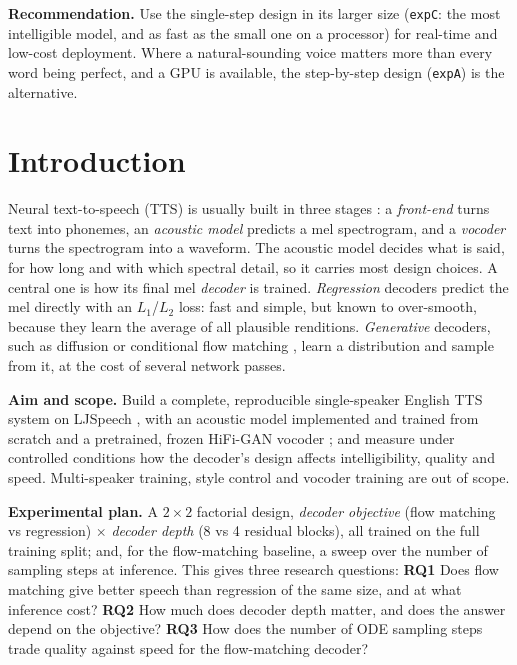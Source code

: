 \documentclass[11pt,a4paper]{article}
\newcommand{\expA}{\texttt{expA}}
\newcommand{\expC}{\texttt{expC}}
\begin{document}
\noindent\textbf{Recommendation.} Use the single-step design in its larger size (\expC: the most intelligible model, and as fast as the small one on a processor) for real-time and low-cost deployment. Where a natural-sounding voice matters more than every word being perfect, and a GPU is available, the step-by-step design (\expA) is the alternative.
\newpage

\section{Introduction}
Neural text-to-speech (TTS) is usually built in three stages \citep{shen2018tacotron2,ren2021fastspeech2}: a \emph{front-end} turns text into phonemes, an \emph{acoustic model} predicts a mel spectrogram, and a \emph{vocoder} turns the spectrogram into a waveform. The acoustic model decides what is said, for how long and with which spectral detail, so it carries most design choices. A central one is how its final mel \emph{decoder} is trained. \emph{Regression} decoders \citep{ren2021fastspeech2} predict the mel directly with an $L_1$/$L_2$ loss: fast and simple, but known to over-smooth, because they learn the average of all plausible renditions. \emph{Generative} decoders, such as diffusion \citep{popov2021gradtts} or conditional flow matching \citep{mehta2024matcha}, learn a distribution and sample from it, at the cost of several network passes.

\noindent\textbf{Aim and scope.} Build a complete, reproducible single-speaker English TTS system on LJSpeech \citep{ito2017ljspeech}, with an acoustic model implemented and trained from scratch and a pretrained, frozen HiFi-GAN vocoder \citep{kong2020hifigan}; and measure under controlled conditions how the decoder's design affects intelligibility, quality and speed. Multi-speaker training, style control and vocoder training are out of scope.

\noindent\textbf{Experimental plan.} A $2\times2$ factorial design, \emph{decoder objective} (flow matching vs regression) $\times$ \emph{decoder depth} (8 vs 4 residual blocks), all trained on the full training split; and, for the flow-matching baseline, a sweep over the number of sampling steps at inference. This gives three research questions:
\textbf{RQ1} Does flow matching give better speech than regression of the same size, and at what inference cost?
\textbf{RQ2} How much does decoder depth matter, and does the answer depend on the objective?
\textbf{RQ3} How does the number of ODE sampling steps trade quality against speed for the flow-matching decoder?
\end{document}
